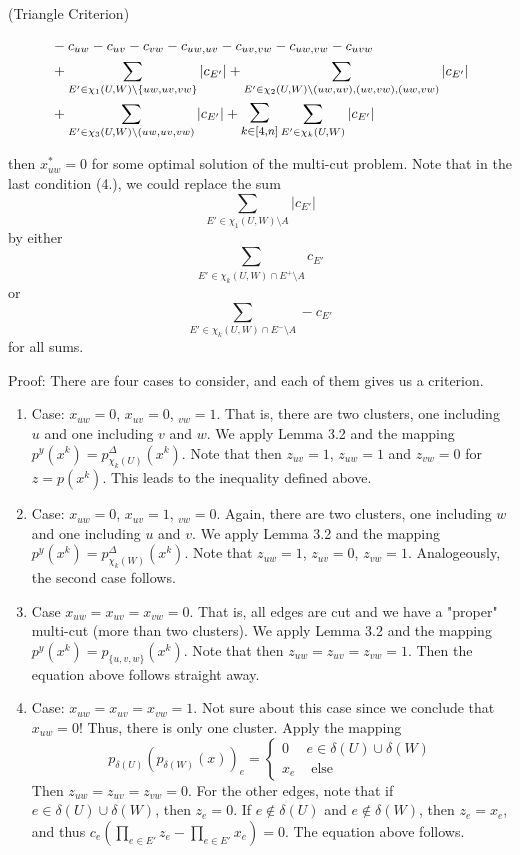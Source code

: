 \begin{theorem}{(Triangle Criterion)}
\begin{enumerate}
\begin{equation*}
\begin{split}
    & -c_{uw}-c_{uv}-c_{vw}-c_{uw,uv}-c_{uv,vw}-c_{uw,vw}-c_{uvw}\\ &  +
    \sum_{E' \in \chi_1(U,W) \setminus \{uw,uv,vw\} } |c_{E'}| +  \sum_{E' \in \chi_2(U,W) \setminus (uw,uv), (uv,vw), (uw,vw) } |c_{E'}|  \\& +  \sum_{E' \in \chi_3(U,W) \setminus (uw, uv,vw)} |c_{E'}| + \mathlarger{\mathlarger{\sum}}_{k \in [4,n]}  \sum_{E' \in \chi_k(U,W)} |c_{E'}|
    \end{split}
\end{equation*}
\end{enumerate}
then $x^*_{uw}=0$ for some optimal solution of the multi-cut problem. 
Note that in the last condition (4.), we could replace the sum \[ \sum_{E' \in \chi_1(U,W) \setminus A } |c_{E'}| \] by either \[ \sum_{E' \in \chi_k(U,W) \cap E^+ \setminus A} c_{E'}\] or \[ \sum_{E' \in \chi_k(U,W) \cap E^- \setminus A} -c_{E'}\] for all sums. \end{theorem}
Proof: There are four cases to consider, and each of them gives us a criterion. 
\begin{enumerate}
    \item Case: $x_{uw}=0$, $x_{uv}=0$, $_{vw}=1$. That is, there are two clusters, one including $u$ and one including $v$ and $w$. We apply Lemma 3.2 and the mapping $p^y(x^k)=p^{\Delta}_{\chi_k(U)}(x^k)$. Note that then $z_{uv}=1$, $z_{uw}=1$ and $z_{vw}=0$ for $z=p(x^k)$. This leads to the inequality defined above.
    \item Case: $x_{uw}=0$, $x_{uv}=1$, $_{vw}=0$. Again, there are two clusters, one including $w$ and one including $u$ and $v$. We apply Lemma 3.2 and the mapping $p^y(x^k)=p^{\Delta}_{\chi_k(W)}(x^k)$. Note that $z_{uw}=1$, $z_{uv}=0$, $z_{vw}=1$. Analogeously, the second case follows.
    \item Case $x_{uw}=x_{uv}=x_{vw}=0$. That is, all edges are cut and we have a "proper" multi-cut (more than two clusters). We apply Lemma 3.2 and the mapping $p^y(x^k)=p_{\{u,v,w\}}(x^k)$. 
    Note that then $z_{uw}=z_{uv}=z_{vw}=1$. Then the equation above follows straight away. 
    \item Case: $x_{uw}=x_{uv}=x_{vw}=1$. 
    Not sure about this case since we conclude that $x_{uw}=0$! 
    Thus, there is only one cluster. Apply the mapping 
    \[ p_{\delta(U)}(p_{\delta(W)}(x))_e= \begin{cases}
    0 & e \in \delta(U)\cup \delta(W) \\
    x_e & \text{ else } 
    \end{cases} \] Then $z_{uw}=z_{uv}=z_{vw}=0$. For the other edges, note that if $e \in \delta(U) \cup \delta(W)$, then $z_e=0$. If $e \notin \delta(U)$ and $e \notin \delta(W)$, then $z_e=x_e$, and thus $c_e( \prod_{e \in E'} z_e - \prod_{e \in E'} x_e)=0.$ The equation above follows. 
\end{enumerate}



